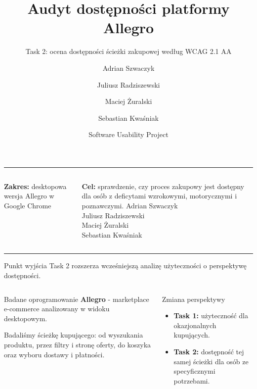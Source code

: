 \documentclass[aspectratio=169,11pt]{beamer}
\title[Audyt dostępności Allegro]{Audyt dostępności platformy Allegro}
\subtitle{Task 2: ocena dostępności ścieżki zakupowej według WCAG 2.1 AA}
\author{Adrian Szwaczyk \and Juliusz Radziszewski \and Maciej Żuralski \and Sebastian Kwaśniak}
\date{Software Usability Project}
\newcommand{\tagline}[1]{\textcolor{Slate}{\small #1}}
\begin{document}
\begin{frame}[plain]
  \vspace{0.8cm}
  {\color{AccentOrange}\rule{\textwidth}{1.2pt}}
  \vspace{0.8cm}

  {\inserttitle\par}
  \vspace{0.35cm}
  {\textcolor{Slate}{\insertsubtitle}\par}
  \vspace{0.9cm}

  \begin{columns}[T,totalwidth=\textwidth]
      \textbf{Zakres:} desktopowa wersja Allegro w Google Chrome\par
      \vspace{0.2cm}
      \textbf{Cel:} sprawdzenie, czy proces zakupowy jest dostępny dla osób z deficytami wzrokowymi, motorycznymi i poznawczymi.
      \raggedleft
      \textcolor{Slate}{\small Adrian Szwaczyk\\Juliusz Radziszewski\\Maciej Żuralski\\Sebastian Kwaśniak}
  \end{columns}

  \vfill
  {\color{AccentOrange}\rule{0.34\textwidth}{3pt}}
\end{frame}

\begin{frame}{Punkt wyjścia}
  \tagline{Task 2 rozszerza wcześniejszą analizę użyteczności o perspektywę dostępności.}

  \vspace{0.35cm}
  \begin{columns}[T,totalwidth=\textwidth]
      \begin{block}{Badane oprogramowanie}
        \textbf{Allegro} - marketplace e-commerce analizowany w widoku desktopowym.

        \vspace{0.25cm}
        Badaliśmy ścieżkę kupującego: od wyszukania produktu, przez filtry i stronę oferty, do koszyka oraz wyboru dostawy i płatności.
      \end{block}

      \begin{exampleblock}{Zmiana perspektywy}
        \begin{itemize}
          \item \textbf{Task 1:} użyteczność dla okazjonalnych kupujących.
          \item \textbf{Task 2:} dostępność tej samej ścieżki dla osób ze specyficznymi potrzebami.
        \end{itemize}
      \end{exampleblock}
  \end{columns}
\end{frame}
\end{document}
